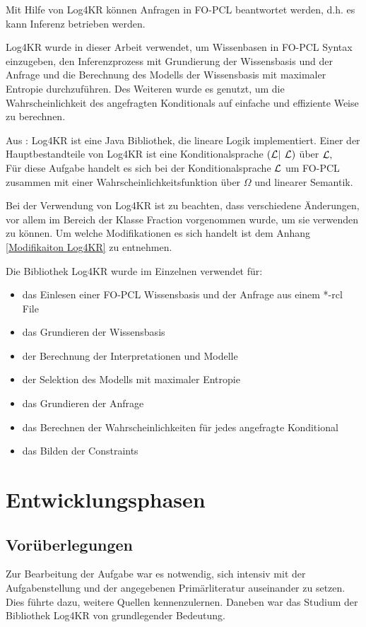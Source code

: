 \documentclass[a4paper, 11pt]{book}
\begin{document}
Mit Hilfe von Log4KR können Anfragen in FO-PCL beantwortet werden, d.h. es kann Inferenz betrieben werden.  

Log4KR wurde in dieser Arbeit verwendet, um Wissenbasen in FO-PCL Syntax einzugeben, den Inferenzprozess mit Grundierung der Wissensbasis und der Anfrage und die Berechnung des Modells der Wissensbasis mit maximaler Entropie durchzuführen. Des Weiteren wurde es genutzt, um die Wahrscheinlichkeit des angefragten Konditionals auf einfache und effiziente Weise zu berechnen.


Aus \cite{P15}: Log4KR ist eine Java Bibliothek, die lineare Logik implementiert. Einer der Hauptbestandteile von Log4KR ist eine Konditionalsprache $ (\cal L $$ \mid $  $ \cal L )$ über $ \cal L, $ \\
Für diese Aufgabe handelt es sich bei der Konditionalsprache $ \cal L $ um FO-PCL zusammen mit einer Wahrscheinlichkeitsfunktion über $ \Omega $ und linearer Semantik. 

Bei der Verwendung von Log4KR ist zu beachten, dass verschiedene Änderungen, vor allem im Bereich der Klasse Fraction vorgenommen wurde, um sie verwenden zu können. Um welche Modifikationen es sich handelt ist dem Anhang \ref{Modifikaiton Log4KR} zu entnehmen.


Die Bibliothek Log4KR wurde im Einzelnen verwendet für:\\
\begin{itemize}
	\item das Einlesen einer FO-PCL Wissensbasis und der Anfrage aus einem *-rcl File
	\item das Grundieren der Wissensbasis
	\item der Berechnung der Interpretationen und Modelle
	\item der Selektion des Modells mit maximaler Entropie
	\item das Grundieren der Anfrage
	\item das Berechnen der Wahrscheinlichkeiten für jedes angefragte Konditional
	\item das Bilden der Constraints 
\end{itemize}

\section{Entwicklungsphasen}\label{Dok}
\subsection{Vorüberlegungen}
Zur Bearbeitung der Aufgabe war es notwendig, sich intensiv mit der Aufgabenstellung und der angegebenen Primärliteratur auseinander zu setzen. Dies führte dazu, weitere Quellen kennenzulernen. Daneben war das Studium der Bibliothek Log4KR von grundlegender Bedeutung. 
\end{document}
